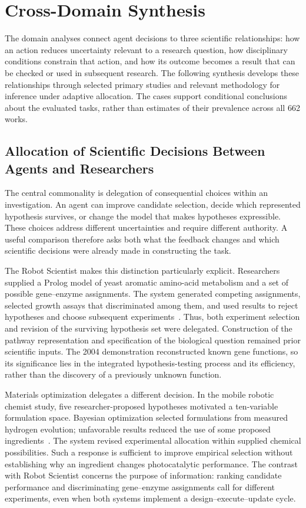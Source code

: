 \section{Cross-Domain Synthesis}
\label{sec:synthesis}

The domain analyses connect agent decisions to three scientific relationships: how an action reduces uncertainty relevant to a research question, how disciplinary conditions constrain that action, and how its outcome becomes a result that can be checked or used in subsequent research. The following synthesis develops these relationships through selected primary studies and relevant methodology for inference under adaptive allocation. The cases support conditional conclusions about the evaluated tasks, rather than estimates of their prevalence across all 662 works.

\subsection{Allocation of Scientific Decisions Between Agents and Researchers}
\label{sec:workflow-delegation}

The central commonality is delegation of consequential choices within an investigation. An agent can improve candidate selection, decide which represented hypothesis survives, or change the model that makes hypotheses expressible. These choices address different uncertainties and require different authority. A useful comparison therefore asks both what the feedback changes and which scientific decisions were already made in constructing the task.

The Robot Scientist makes this distinction particularly explicit. Researchers supplied a Prolog model of yeast aromatic amino-acid metabolism and a set of possible gene--enzyme assignments. The system generated competing assignments, selected growth assays that discriminated among them, and used results to reject hypotheses and choose subsequent experiments~\cite{king2004}. Thus, both experiment selection and revision of the surviving hypothesis set were delegated. Construction of the pathway representation and specification of the biological question remained prior scientific inputs. The 2004 demonstration reconstructed known gene functions, so its significance lies in the integrated hypothesis-testing process and its efficiency, rather than the discovery of a previously unknown function.

Materials optimization delegates a different decision. In the mobile robotic chemist study, five researcher-proposed hypotheses motivated a ten-variable formulation space. Bayesian optimization selected formulations from measured hydrogen evolution; unfavorable results reduced the use of some proposed ingredients~\cite{burger2020}. The system revised experimental allocation within supplied chemical possibilities. Such a response is sufficient to improve empirical selection without establishing why an ingredient changes photocatalytic performance. The contrast with Robot Scientist concerns the purpose of information: ranking candidate performance and discriminating gene--enzyme assignments call for different experiments, even when both systems implement a design--execute--update cycle.

